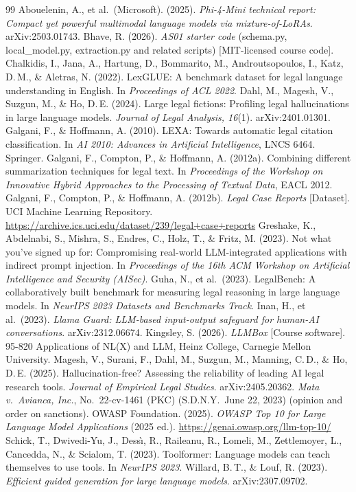\documentclass[10pt,letterpaper]{article}
\begin{document}
\begin{thebibliography}{99}\setlength{\itemsep}{1pt}
 Abouelenin, A., et al.\ (Microsoft). (2025). \emph{Phi-4-Mini technical report: Compact yet powerful multimodal language models via mixture-of-LoRAs}. arXiv:2503.01743.
 Bhave, R. (2026). \emph{AS01 starter code} (schema.py, local\_model.py, extraction.py and related scripts) [MIT-licensed course code].
 Chalkidis, I., Jana, A., Hartung, D., Bommarito, M., Androutsopoulos, I., Katz, D.\,M., \& Aletras, N. (2022). LexGLUE: A benchmark dataset for legal language understanding in English. In \emph{Proceedings of ACL 2022}.
 Dahl, M., Magesh, V., Suzgun, M., \& Ho, D.\,E. (2024). Large legal fictions: Profiling legal hallucinations in large language models. \emph{Journal of Legal Analysis, 16}(1). arXiv:2401.01301.
 Galgani, F., \& Hoffmann, A. (2010). LEXA: Towards automatic legal citation classification. In \emph{AI 2010: Advances in Artificial Intelligence}, LNCS 6464. Springer.
 Galgani, F., Compton, P., \& Hoffmann, A. (2012a). Combining different summarization techniques for legal text. In \emph{Proceedings of the Workshop on Innovative Hybrid Approaches to the Processing of Textual Data}, EACL 2012.
 Galgani, F., Compton, P., \& Hoffmann, A. (2012b). \emph{Legal Case Reports} [Dataset]. UCI Machine Learning Repository. \url{https://archive.ics.uci.edu/dataset/239/legal+case+reports}
 Greshake, K., Abdelnabi, S., Mishra, S., Endres, C., Holz, T., \& Fritz, M. (2023). Not what you've signed up for: Compromising real-world LLM-integrated applications with indirect prompt injection. In \emph{Proceedings of the 16th ACM Workshop on Artificial Intelligence and Security (AISec)}.
 Guha, N., et al.\ (2023). LegalBench: A collaboratively built benchmark for measuring legal reasoning in large language models. In \emph{NeurIPS 2023 Datasets and Benchmarks Track}.
 Inan, H., et al.\ (2023). \emph{Llama Guard: LLM-based input-output safeguard for human-AI conversations}. arXiv:2312.06674.
 Kingsley, S. (2026). \emph{LLMBox} [Course software]. 95-820 Applications of NL(X) and LLM, Heinz College, Carnegie Mellon University.
 Magesh, V., Surani, F., Dahl, M., Suzgun, M., Manning, C.\,D., \& Ho, D.\,E. (2025). Hallucination-free? Assessing the reliability of leading AI legal research tools. \emph{Journal of Empirical Legal Studies}. arXiv:2405.20362.
 \emph{Mata v.\ Avianca, Inc.}, No.\ 22-cv-1461 (PKC) (S.D.N.Y.\ June 22, 2023) (opinion and order on sanctions).
 OWASP Foundation. (2025). \emph{OWASP Top 10 for Large Language Model Applications} (2025 ed.). \url{https://genai.owasp.org/llm-top-10/}
 Schick, T., Dwivedi-Yu, J., Dess\`{\i}, R., Raileanu, R., Lomeli, M., Zettlemoyer, L., Cancedda, N., \& Scialom, T. (2023). Toolformer: Language models can teach themselves to use tools. In \emph{NeurIPS 2023}.
 Willard, B.\,T., \& Louf, R. (2023). \emph{Efficient guided generation for large language models}. arXiv:2307.09702.
\end{thebibliography}
\normalsize
\end{document}
